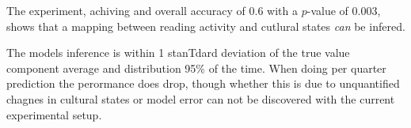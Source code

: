 The experiment, achiving and overall accuracy of 0.6 with a $p$-value of 0.003, shows that a mapping between reading activity and cutlural states \emph{can} be infered.

The models inference is within 1 stanTdard deviation of the true value component average and distribution 95\% of the time. When doing per quarter prediction the perormance does drop, though whether this is due to unquantified chagnes in cultural states or model error can not be discovered with the current experimental setup.
